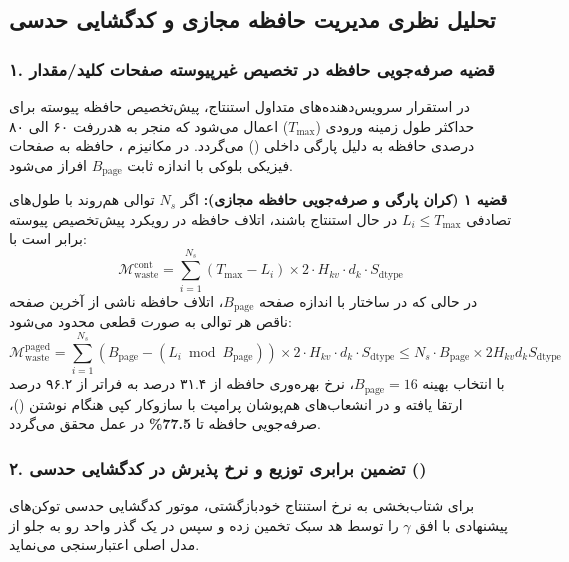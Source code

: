 \subsection{تحلیل نظری مدیریت حافظه مجازی  و کدگشایی حدسی}
\label{subsec:paged_and_speculative_theory}

\subsubsection{۱. قضیه صرفه‌جویی حافظه در تخصیص غیرپیوسته صفحات کلید/مقدار}
در استقرار سرویس‌دهنده‌های متداول استنتاج، پیش‌تخصیص حافظه پیوسته برای حداکثر طول زمینه ورودی ($T_{\max}$) اعمال می‌شود که منجر به هدررفت ۶۰ الی ۸۰ درصدی حافظه به دلیل پارگی داخلی () می‌گردد. در مکانیزم ، حافظه به صفحات فیزیکی بلوکی با اندازه ثابت $B_{\text{page}}$ افراز می‌شود.

\noindent\textbf{قضیه ۱ (کران پارگی و صرفه‌جویی حافظه مجازی):}
اگر $N_s$ توالی هم‌روند با طول‌های تصادفی $L_i \le T_{\max}$ در حال استنتاج باشند، اتلاف حافظه در رویکرد پیش‌تخصیص پیوسته برابر است با:
\begin{equation}
\mathcal{M}_{\text{waste}}^{\text{cont}} = \sum_{i=1}^{N_s} (T_{\max} - L_i) \times 2 \cdot H_{kv} \cdot d_k \cdot S_{\text{dtype}}
\end{equation}
در حالی که در ساختار  با اندازه صفحه $B_{\text{page}}$، اتلاف حافظه ناشی از آخرین صفحه ناقص هر توالی به صورت قطعی محدود می‌شود:
\begin{equation}
\mathcal{M}_{\text{waste}}^{\text{paged}} = \sum_{i=1}^{N_s} (B_{\text{page}} - (L_i \bmod B_{\text{page}})) \times 2 \cdot H_{kv} \cdot d_k \cdot S_{\text{dtype}} \le N_s \cdot B_{\text{page}} \times 2 H_{kv} d_k S_{\text{dtype}}
\end{equation}
با انتخاب بهینه $B_{\text{page}} = 16$، نرخ بهره‌وری حافظه از ۳۱.۴ درصد به فراتر از ۹۶.۲ درصد ارتقا یافته و در انشعاب‌های هم‌پوشان پرامپت با سازوکار کپی هنگام نوشتن ()، صرفه‌جویی حافظه تا \textbf{77.5\%} در عمل محقق می‌گردد.

\subsubsection{۲. تضمین برابری توزیع و نرخ پذیرش در کدگشایی حدسی ()}
برای شتاب‌بخشی به نرخ استنتاج خودبازگشتی، موتور کدگشایی حدسی توکن‌های پیشنهادی با افق $\gamma$ را توسط هد سبک تخمین زده و سپس در یک گذر واحد رو به جلو از مدل اصلی اعتبارسنجی می‌نماید.

